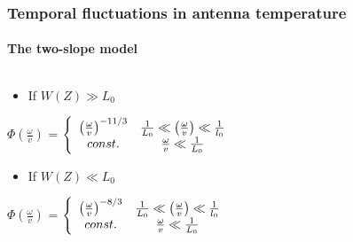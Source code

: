 \documentclass[aspectratio=169]{beamer}
\begin{document}
\begin{frame}
    \frametitle{Temporal fluctuations in antenna temperature}
    \framesubtitle{The two-slope model}
    \begin{columns}
        \begin{column}{0.5\textwidth}
            \begin{itemize}
                \item If $W(Z) \gg L_0$
            \end{itemize}
            \begin{center}
                $\Phi\left(\frac{\omega}{v}\right)$ = $\left\lbrace \begin{array}{c c} \left(\frac{\omega}{v}\right)^{-11/3} & \frac{1}{L_0}\ll\left(\frac{\omega}{v}\right)\ll \frac{1}{l_0} \\ const. & \frac{\omega}{v}\ll \frac{1}{L_0} \end{array} \right.$
            \end{center}
            \begin{itemize}
                \item If $W(Z) \ll L_0$
            \end{itemize}
            \begin{center}
                $\Phi\left(\frac{\omega}{v}\right)$ = $\left\lbrace \begin{array}{c c} \left(\frac{\omega}{v}\right)^{-8/3} & \frac{1}{L_0}\ll\left(\frac{\omega}{v}\right)\ll \frac{1}{l_0} \\ const. & \frac{\omega}{v}\ll \frac{1}{L_0} \end{array} \right.$
            \end{center}
        \end{column}
        \begin{column}{0.5\textwidth}
            \centering

\end{column}
\end{columns}
\end{frame}
\end{document}
